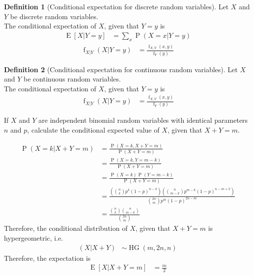 \documentclass[titlepage, fleqn, a4paper, 12pt, twoside]{article}
\theoremstyle{definition}
\newtheorem{definition}{Definition}
\theoremstyle{theorem}
\DeclareMathOperator{\prob}{\mathrm{P}}
\DeclareMathOperator{\expct}{\mathrm{E}}
\DeclareMathOperator{\pdf}{\mathrm{f}}
\DeclareMathOperator{\hg}{\mathrm{HG}}
\begin{document}
\begin{definition}[Conditional expectation for discrete random variables]
	Let $X$ and $Y$ be discrete random variables.\\
	The conditional expectation of $X$, given that $Y = y$ is
	\begin{align*}
		\expct[X | Y = y] &= \sum\limits_{x} \prob(X = x | Y = y)
	\end{align*}
	\begin{align*}
		\pdf_{X|Y}(X | Y = y) &= \frac{\pdf_{X,Y}(x,y)}{\pdf_Y(y)}
	\end{align*}
\end{definition}

\begin{definition}[Conditional expectation for continuous random variables]
	Let $X$ and $Y$ be continuous random variables.\\
	The conditional expectation of $X$, given that $Y = y$ is
	\begin{align*}
		\pdf_{X|Y}(X | Y = y) &= \frac{\pdf_{X,Y}(x,y)}{\pdf_Y(y)}
	\end{align*}
\end{definition}

\begin{question}
	If $X$ and $Y$ are independent binomial random variables with identical parameters $n$ and $p$, calculate the conditional expected value of $X$, given that $X + Y = m$.
\end{question}

\begin{solution}
	\begin{align*}
		\prob(X = k | X + Y = m) &= \frac{\prob(X = k , X + Y = m)}{\prob(X + Y = m)}\\
		&= \frac{\prob(X = k , Y = m - k)}{\prob(X + Y = m)}\\
		&= \frac{\prob(X = k) \prob(Y = m - k)}{\prob(X + Y = m)}\\
		&= \frac{\left( \binom{n}{k} p^k (1 - p)^{n - k} \right) \left( \binom{n}{m - k} p^{m - k} (1 - p)^{n - m + k} \right)}{\binom{2 n}{m} p^m (1 - p)^{2 n - m}}\\
		&= \frac{\binom{n}{k} \binom{n}{m - k}}{\binom{2 n}{m}}
	\end{align*}
	Therefore, the conditional distribution of $X$, given that $X + Y = m$ is hypergeometric, i.e.
	\begin{align*}
		(X | X + Y) &\sim \hg(m, 2 n, n)
	\end{align*}
	Therefore, the expectation is
	\begin{align*}
		\expct[X | X + Y = m] &= \frac{m}{2}
	\end{align*}
\end{solution}
\end{document}
